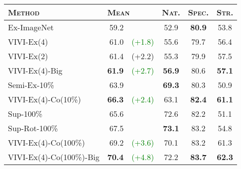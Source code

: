 \documentclass[10pt,twocolumn,letterpaper]{article}
\begin{document}
\begin{table*}[h!]
    \centering
    \small
    \small
\newcommand{\green}[1]{\textcolor{Green}{(#1)}}
\begin{tabular}{lrlccc}
\toprule
\textsc{Method}                     & \multicolumn{2}{l}{\textsc{Mean}}                          & \textsc{Nat.} & \textsc{Spec.} & \textsc{Str.} \\
\midrule
Ex-ImageNet             &     59.2 & &       52.9 &       \bf 80.9 &       53.8 \\
VIVI-Ex(4)              &     61.0 &  \green{+1.8} &       55.6 &        79.7 &       56.4 \\
\color{lightgray} VIVI-Ex(2)              &     \color{lightgray} 61.4 &  \color{lightgray} (+2.2) &   \color{lightgray} 55.3 &        \color{lightgray} 79.9 &       \color{lightgray} 57.5 \\
VIVI-Ex(4)-Big          &     \bf 61.9 &  \green{+2.7}&      \bf 56.9 &        80.6 &      \bf 57.1 \\
          \midrule
Semi-Ex-10\%~\cite{zhai2019visual}             &     63.9 & &       \bf 69.3 &        80.3 &       50.9 \\
VIVI-Ex(4)-Co(10\%)      &     \bf 66.3 & \green{+2.4} &       63.1 &        \bf 82.4 &       \bf 61.1 \\
          \midrule
Sup-100\%                &     65.6 & &       72.6 &        82.2 &       51.1 \\
Sup-Rot-100\%~\cite{zhai2019visual}            &     67.5 & &       \bf 73.1 &        83.2 &       54.8 \\
VIVI-Ex(4)-Co(100\%)     &     69.2 & \green{+3.6} &     70.1 &        83.2 &       61.3 \\
VIVI-Ex(4)-Co(100\%)-Big &    \bf 70.4 & \green{+4.8} &       72.2 &        \bf 83.7 &       \bf 62.3 \\
\bottomrule
\end{tabular}     \caption{Testing result summary as in Table~\ref{tab:cotraining} for fine-tuning hyper-parameter selection according to {\bf Version 2 (arXiv:1910.04867v2) of the VTAB benchmark}. Each number is the median of three fine-tuning runs.}
    \label{tab:cotraining-v2}
\end{table*}
\end{document}
